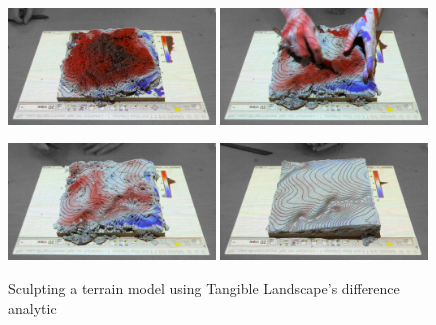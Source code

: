 \documentclass[prodmode,acmtochi]{acmsmall} %
\begin{document}
\begin{figure}[h!]
\begin{center}
		\includegraphics[width=0.49\textwidth]{images/difference/tl_difference_1.jpg}
		\includegraphics[width=0.49\textwidth]{images/difference/tl_difference_2.jpg}\vspace*{0.2em}
		
		\includegraphics[width=0.49\textwidth]{images/difference/tl_difference_3.jpg}
		\includegraphics[width=0.49\textwidth]{images/difference/tl_difference_4.jpg}
	\caption{Sculpting a terrain model using Tangible Landscape's difference analytic}
	\label{fig:difference_sequence}
\end{center}
\end{figure}

\end{document}
